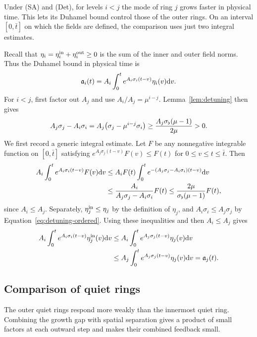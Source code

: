 Under (SA) and (Det), for levels $i<j$ the mode of ring $j$ grows faster in physical time.
This lets its Duhamel bound control those of the outer rings. On an interval
$[0,\bar t]$ on which the fields are defined, the comparison uses just two
integral estimates.

Recall that
$\eta_i=\eta^{\mathrm{in}}_i+\eta^{\mathrm{out}}_i\ge0$ is the sum of the inner and outer field norms.
Thus the Duhamel bound in physical time is
\begin{equation}
\label{eq:O-duh}
\mathfrak{a}_i(t)=A_i\int_0^t e^{A_i\sigma_i(t-v)}\eta_i(v)\dd v.
\end{equation}
For $i<j$, first factor out $A_j$ and use $A_i/A_j=\mu^{i-j}$.
Lemma~\ref{lem:detuning} then gives
\[
A_j\sigma_j-A_i\sigma_i
=A_j\big(\sigma_j-\mu^{i-j}\sigma_i\big)
\ge\frac{A_j\sigma_\flat(\mu-1)}{2\mu}>0.
\]
We first record a generic integral estimate. Let $F$ be any nonnegative
integrable function on $[0,\bar t]$ satisfying
$e^{A_j\sigma_j(t-v)}F(v)\le F(t)$ for $0\le v\le t\le\bar t$.
Then
\begin{equation}
\label{eq:O-fast}
\begin{aligned}
A_i\int_0^t e^{A_i\sigma_i(t-v)}F(v)\dd v
&\le A_iF(t)\int_0^t e^{-(A_j\sigma_j-A_i\sigma_i)(t-v)}\dd v\\
&\le\frac{A_i}{A_j\sigma_j-A_i\sigma_i}F(t)\le\frac{2\mu}{\sigma_\flat(\mu-1)}F(t),
\end{aligned}
\end{equation}
since $A_i\le A_j$. Separately, $\eta^{\mathrm{in}}_j\le\eta_j$ by the definition of
$\eta_j$, and $A_i\sigma_i\le A_j\sigma_j$ by Equation~\eqref{eq:detuning-ordered}.
Using these inequalities and then $A_i\le A_j$ gives
\begin{equation}
\label{eq:O-same}
\begin{aligned}
A_i\int_0^t e^{A_i\sigma_i(t-v)}\eta^{\mathrm{in}}_j(v)\dd v
&\le A_i\int_0^t e^{A_j\sigma_j(t-v)}\eta_j(v)\dd v\\
&\le A_j\int_0^t e^{A_j\sigma_j(t-v)}\eta_j(v)\dd v=\mathfrak{a}_j(t).
\end{aligned}
\end{equation}

\subsection{Comparison of quiet rings}
\label{sec:proof-O}

The outer quiet rings respond more weakly than the innermost quiet ring.
Combining the growth gap with spatial separation gives a product of small
factors at each outward step and makes their combined feedback small.

